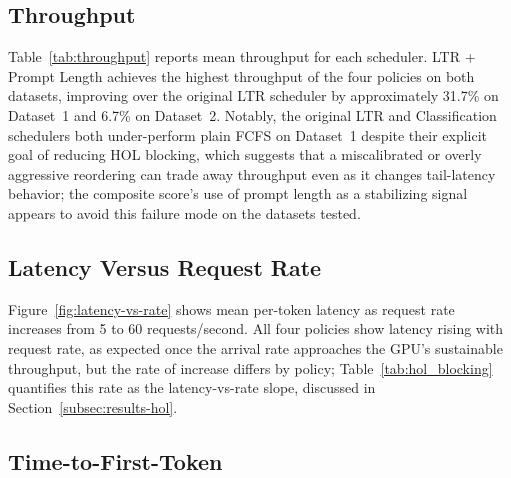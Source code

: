 \subsection{Throughput}
\label{subsec:results-throughput}

Table~\ref{tab:throughput} reports mean throughput for each scheduler.
LTR + Prompt Length achieves the highest throughput of the four policies on
both datasets, improving over the original LTR scheduler by approximately
31.7\% on Dataset~1 and 6.7\% on Dataset~2. Notably, the original LTR and
Classification schedulers both under-perform plain FCFS on Dataset~1 despite
their explicit goal of reducing HOL blocking, which suggests that a
miscalibrated or overly aggressive reordering can trade away throughput even
as it changes tail-latency behavior; the composite score's use of prompt
length as a stabilizing signal appears to avoid this failure mode on the
datasets tested.


\subsection{Latency Versus Request Rate}
\label{subsec:results-latency}

Figure~\ref{fig:latency-vs-rate} shows mean per-token latency as request rate
increases from 5 to 60 requests/second. All four policies show latency
rising with request rate, as expected once the arrival rate approaches the
GPU's sustainable throughput, but the rate of increase differs by policy;
Table~\ref{tab:hol_blocking} quantifies this rate as the latency-vs-rate
slope, discussed in Section~\ref{subsec:results-hol}.

\subsection{Time-to-First-Token}
\label{subsec:results-ttft}

